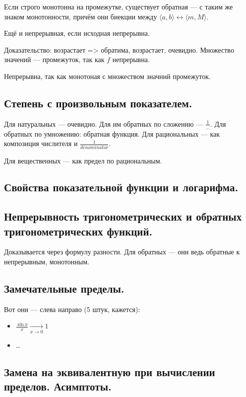 \documentclass[12pt, a4paper]{article}
\begin{document}
Если строго монотонна на промежутке,
существует обратная — с таким же знаком монотонности, причём они биекции между $\langle a, b \rangle \leftrightarrow \langle m, M \rangle$.

Ещё и непрерывная, если исходная непрерывна.


Доказательство: возрастает => обратима, возрастает, очевидно.
Множество значений — промежуток, так как $f$ непрерывна.

Непрерывна, так как монотоная с множеством значний промежуток.


\subsection{Степень с произвольным показателем.}

Для натуральных — очевидно.
Для им обратных по сложению — $\frac{1}{…}$.
Для обратных по умножению: обратная функция.
Для рациональных — как композиция числителя и $\frac{1}{denominator}$.

Для вещественных — как предел по рациональным.


\subsection{Свойства показательной функции и логарифма.}

\subsection{Непрерывность тригонометрических и обратных тригонометрических функций.}

Доказывается через формулу разности.
Для обратных — они ведь обратные к непрерывным, монотонным.

\subsection{Замечательные пределы.}

Вот они — слева направо (5 штук, кажется):

\begin{itemize}
    \item $\frac{\sin x}{x} \underset{x \to 0}{\longrightarrow} 1$
    \item …
\end{itemize}

\subsection{Замена на эквивалентную при вычислении пределов. Асимптоты.}
\end{document}

